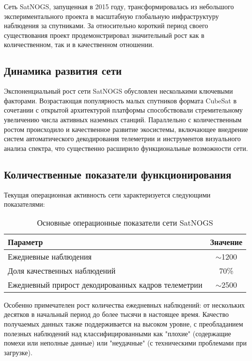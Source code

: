 Сеть SatNOGS, запущенная в 2015 году, трансформировалась из небольшого
экспериментального проекта в масштабную глобальную инфраструктуру наблюдения за
спутниками. За относительно короткий период своего существования проект
продемонстрировал значительный рост как в количественном, так и в качественном
отношении.

\subsection{Динамика развития сети}

Экспоненциальный рост сети SatNOGS обусловлен несколькими ключевыми факторами.
Возрастающая популярность малых спутников формата CubeSat в сочетании с
открытой архитектурой платформы способствовали стремительному увеличению числа
активных наземных станций. Параллельно с количественным ростом происходило и
качественное развитие экосистемы, включающее внедрение систем автоматического
декодирования телеметрии и инструментов визуального анализа спектра, что
существенно расширило функциональные возможности сети.

\subsection{Количественные показатели функционирования}

Текущая операционная активность сети характеризуется следующими показателями:

\begin{table}[htbp]
	\centering
	\begin{tabular}{|l|c|}
		\hline
		\textbf{Параметр}                                   & \textbf{Значение} \\
		\hline
		Ежедневные наблюдения                               & $\sim$1200        \\
		Доля качественных наблюдений                        & 70\%              \\
		Ежедневный прирост декодированных кадров телеметрии & $\sim$2500        \\
		\hline
	\end{tabular}
	\caption{Основные операционные показатели сети SatNOGS}
	\label{tab:satnogs_stats}
\end{table}

Особенно примечателен рост количества ежедневных наблюдений: от нескольких
десятков в начальный период до более тысячи в настоящее время. Качество
получаемых данных также поддерживается на высоком уровне, с преобладанием
полезных наблюдений над классифицированными как "плохие" (содержащие помехи или
неполные данные) или "неудачные" (с техническими проблемами при загрузке).

